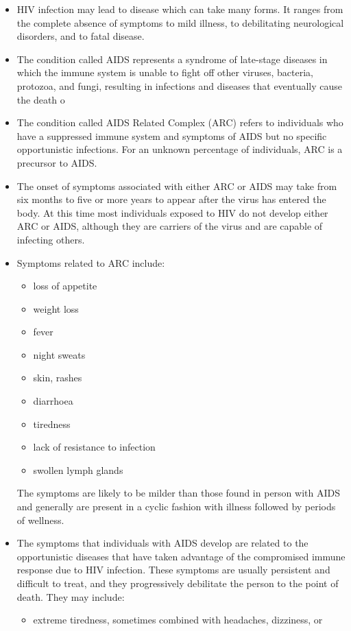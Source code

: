 \begin{itemize}
\item HIV infection may lead to disease which can take many forms. It ranges from the
complete absence of symptoms to mild illness, to debilitating neurological disorders, and
to fatal disease.
\item The condition called AIDS represents a syndrome of late-stage diseases in which the
immune system is unable to fight off other viruses, bacteria, protozoa, and fungi, resulting
in infections and diseases that eventually cause the death o
\item The condition called AIDS Related Complex (ARC) refers to individuals who have a
suppressed immune system and symptoms of AIDS but no specific opportunistic
infections. For an unknown percentage of individuals, ARC is a precursor to AIDS.
\item The onset of symptoms associated with either ARC or AIDS may take from six months to
five or more years to appear after the virus has entered the body. At this time most
individuals exposed to HIV do not develop either ARC or AIDS, although they are carriers
of the virus and are capable of infecting others.
\item Symptoms related to ARC include:
	\begin{itemize}
	\item loss of appetite
	\item weight loss
	\item fever
	\item night sweats
	\item skin, rashes
	\item diarrhoea
	\item tiredness
	\item lack of resistance to infection
	\item swollen lymph glands
	\end{itemize}
	The symptoms are likely to be milder than those found in person with AIDS and generally are
present in a cyclic fashion with illness followed by periods of wellness.
\item The symptoms that individuals with AIDS develop are related to the opportunistic
diseases that have taken advantage of the compromised immune response due to HIV
infection. These symptoms are usually persistent and difficult to treat, and they
progressively debilitate the person to the point of death. They may include:
	\begin{itemize}
	\item extreme tiredness, sometimes combined with headaches, dizziness, or

\end{itemize}
\end{itemize}
